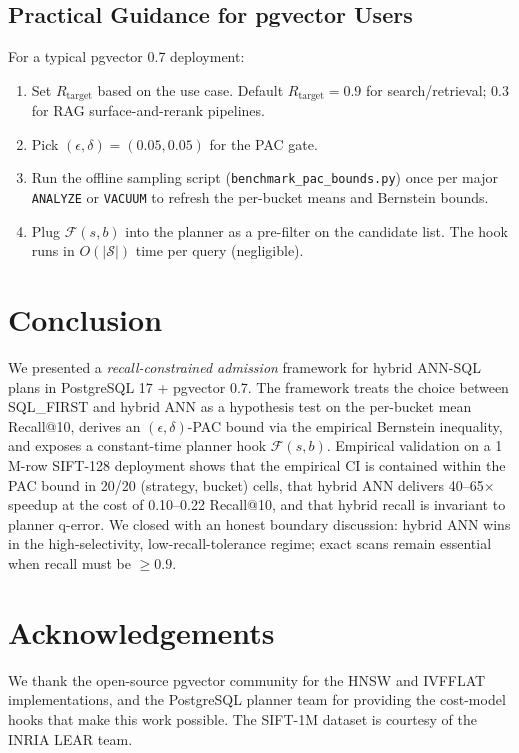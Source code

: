 \documentclass[conference]{IEEEtran}
\begin{document}
\subsection{Practical Guidance for pgvector Users}
For a typical pgvector 0.7 deployment:
\begin{enumerate}
\item Set $R_{\text{target}}$ based on the use case.  Default
      $R_{\text{target}} = 0.9$ for search/retrieval;  $0.3$
      for RAG surface-and-rerank pipelines.
\item Pick $(\epsilon, \delta) = (0.05, 0.05)$ for the PAC gate.
\item Run the offline sampling script
      (\texttt{benchmark\_pac\_bounds.py}) once per major
      \texttt{ANALYZE} or \texttt{VACUUM} to refresh the
      per-bucket means and Bernstein bounds.
\item Plug $\mathcal{F}(s, b)$ into the planner as a
      pre-filter on the candidate list.  The hook runs in
      $O(|\mathcal{S}|)$ time per query (negligible).
\end{enumerate}

\section{Conclusion}
\label{sec:conc}
We presented a \emph{recall-constrained admission} framework for
hybrid ANN-SQL plans in PostgreSQL 17 + pgvector 0.7.  The
framework treats the choice between SQL\_FIRST and hybrid ANN as
a hypothesis test on the per-bucket mean Recall@10, derives an
$(\epsilon, \delta)$-PAC bound via the empirical Bernstein
inequality, and exposes a constant-time planner hook
$\mathcal{F}(s, b)$.  Empirical validation on a 1\,M-row SIFT-128
deployment shows that the empirical CI is contained within the
PAC bound in 20/20 (strategy, bucket) cells, that hybrid ANN
delivers 40--65$\times$ speedup at the cost of 0.10--0.22
Recall@10, and that hybrid recall is invariant to planner
q-error.  We closed with an honest boundary discussion: hybrid
ANN wins in the high-selectivity, low-recall-tolerance regime;
exact scans remain essential when recall must be $\geq 0.9$.

\section*{Acknowledgements}
We thank the open-source pgvector community for the HNSW and
IVFFLAT implementations, and the PostgreSQL planner team for
providing the cost-model hooks that make this work possible.
The SIFT-1M dataset is courtesy of the INRIA LEAR team.
\end{document}
